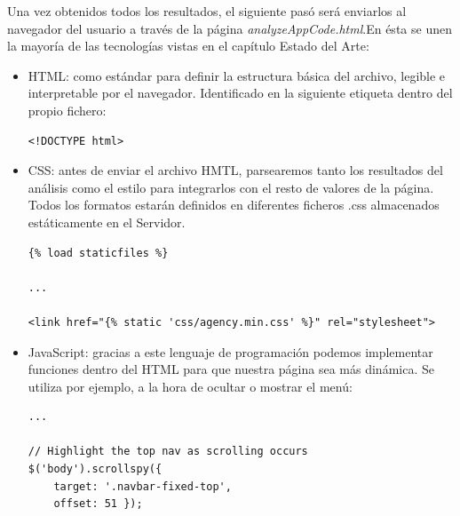 \documentclass[a4paper, 12pt]{book}
\begin{document}
Una vez obtenidos todos los resultados, el siguiente pasó será enviarlos al navegador del usuario a través de la página \textit{analyzeAppCode.html}.En ésta se unen la mayoría de las tecnologías vistas en el capítulo Estado del Arte:
\begin{itemize}
	\item HTML: como estándar para definir la estructura básica del archivo, legible e interpretable por el navegador. Identificado en la siguiente etiqueta dentro del propio fichero:	
		\begin{lstlisting}
<!DOCTYPE html>
		\end{lstlisting}
	\item CSS: antes de enviar el archivo HMTL, parsearemos tanto los resultados del análisis como el estilo para integrarlos con el resto de valores de la página. Todos los formatos estarán definidos en diferentes ficheros .css almacenados estáticamente en el Servidor.  
		\begin{lstlisting}
{% load staticfiles %}

...

<link href="{% static 'css/agency.min.css' %}" rel="stylesheet">
		\end{lstlisting}
	\item JavaScript: gracias a este lenguaje de programación podemos implementar funciones dentro del HTML para que nuestra página sea más dinámica. Se utiliza por ejemplo, a la hora de ocultar o mostrar el menú:
	\begin{lstlisting}
... 

// Highlight the top nav as scrolling occurs
$('body').scrollspy({
	target: '.navbar-fixed-top',
	offset: 51 });


\end{lstlisting}
\end{itemize}
\end{document}
